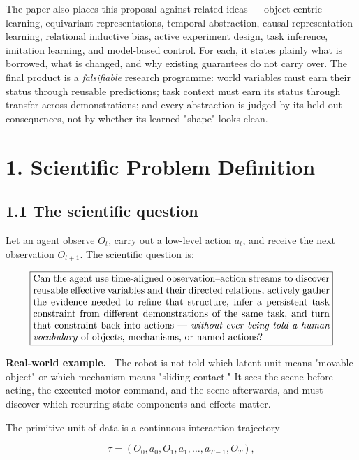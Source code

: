 \documentclass[11pt]{article}
\newenvironment{example}{%
  \par\smallskip\noindent\begin{minipage}{\textwidth}%
  \color{teal!60!black}\small
  \textbf{\color{teal!70!black}Real-world example.}\
}{%
  \end{minipage}\par\smallskip}
\begin{document}
The paper also places this proposal against related ideas --- object-centric learning, equivariant representations, temporal
abstraction, causal representation learning, relational inductive bias, active experiment design, task inference, imitation
learning, and model-based control. For each, it states plainly what is borrowed, what is changed, and why existing guarantees do
not carry over. The final product is a \emph{falsifiable} research programme: world variables must earn their status through
reusable predictions; task context must earn its status through transfer across demonstrations; and every abstraction is judged
by its held-out consequences, not by whether its learned "shape" looks clean.

\section*{1. Scientific Problem Definition}

\subsection*{1.1 The scientific question}

Let an agent observe $O_t$, carry out a low-level action $a_t$, and receive the next observation $O_{t+1}$. The scientific question is:

\[
\boxed{
\begin{minipage}{0.88\textwidth}
Can the agent use time-aligned observation--action streams to discover reusable effective variables and their directed
relations, actively gather the evidence needed to refine that structure, infer a persistent task constraint from different
demonstrations of the same task, and turn that constraint back into actions --- \emph{without ever being told a human
vocabulary} of objects, mechanisms, or named actions?
\end{minipage}}
\]

\begin{example}
The robot is not told which latent unit means "movable object" or which mechanism means "sliding contact." It sees the scene before
acting, the executed motor command, and the scene afterwards, and must discover which recurring state components and effects matter.
\end{example}

The primitive unit of data is a continuous interaction trajectory

\[
\boxed{\tau=(O_0,a_0,O_1,a_1,\ldots,a_{T-1},O_T),}
\]
\end{document}
